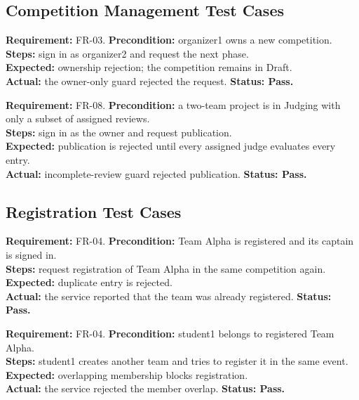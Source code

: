 \documentclass[12pt]{article}
\begin{document}
\subsection{Competition Management Test Cases}
\begin{contentbox}
\textbf{Requirement:} FR-03. \textbf{Precondition:} organizer1 owns a new competition.\\
\textbf{Steps:} sign in as organizer2 and request the next phase.\\
\textbf{Expected:} ownership rejection; the competition remains in Draft.\\
\textbf{Actual:} the owner-only guard rejected the request. \textbf{Status: Pass.}
\end{contentbox}
\begin{contentbox}
\textbf{Requirement:} FR-08. \textbf{Precondition:} a two-team project is in Judging with only a subset of assigned reviews.\\
\textbf{Steps:} sign in as the owner and request publication.\\
\textbf{Expected:} publication is rejected until every assigned judge evaluates every entry.\\
\textbf{Actual:} incomplete-review guard rejected publication. \textbf{Status: Pass.}
\end{contentbox}
\subsection{Registration Test Cases}
\begin{contentbox}
\textbf{Requirement:} FR-04. \textbf{Precondition:} Team Alpha is registered and its captain is signed in.\\
\textbf{Steps:} request registration of Team Alpha in the same competition again.\\
\textbf{Expected:} duplicate entry is rejected.\\
\textbf{Actual:} the service reported that the team was already registered. \textbf{Status: Pass.}
\end{contentbox}
\begin{contentbox}
\textbf{Requirement:} FR-04. \textbf{Precondition:} student1 belongs to registered Team Alpha.\\
\textbf{Steps:} student1 creates another team and tries to register it in the same event.\\
\textbf{Expected:} overlapping membership blocks registration.\\
\textbf{Actual:} the service rejected the member overlap. \textbf{Status: Pass.}
\end{contentbox}
\end{document}
